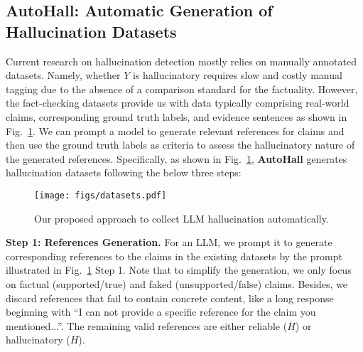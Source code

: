 \subsection{AutoHall: Automatic Generation of Hallucination Datasets}

Current research on hallucination detection mostly relies on manually annotated datasets. Namely, whether $Y$ is hallucinatory requires slow and costly manual tagging due to the absence of a comparison standard for the factuality. However, the fact-checking datasets provide us with data typically comprising real-world claims, corresponding ground truth labels, and evidence sentences as shown in Fig.~\ref{fig:dataset}. We can prompt a model to generate relevant references for claims and then use the ground truth labels as criteria to assess the hallucinatory nature of the generated references. Specifically, as shown in Fig.~\ref{fig:dataset}, \textbf{AutoHall} generates hallucination datasets following the below three steps:

\begin{figure}[h]
\centering
    \texttt{[image: figs/datasets.pdf]}
    \caption{Our proposed approach to collect LLM hallucination automatically. \color{black}{: the grounded information. }}
    \label{fig:dataset}
\end{figure}

\textbf{Step 1: References Generation.} %
For an LLM, we prompt it to generate corresponding references to the claims in the existing datasets by the prompt illustrated in Fig.~\ref{fig:dataset} Step 1. Note that to simplify the generation, we only focus on factual (supported/true) and faked (unsupported/false) claims. 
Besides, we discard references that fail to contain concrete content, like a long response beginning with ``I can not provide a specific reference for the claim you mentioned...''. 
The remaining valid references are either reliable ($\overline{H}$) or hallucinatory ($H$).

